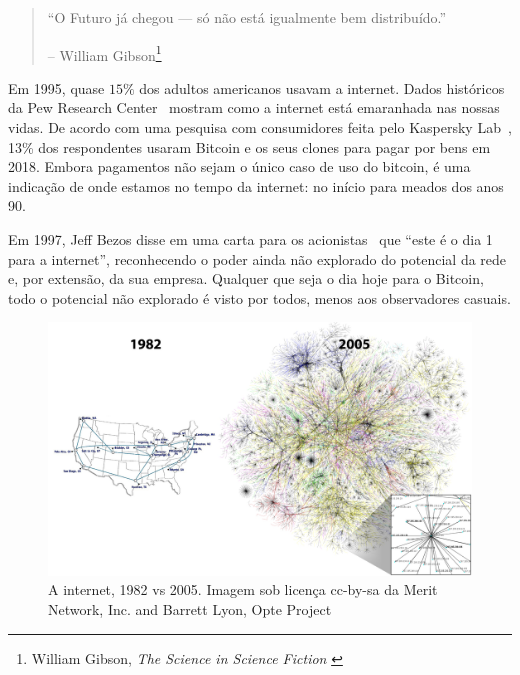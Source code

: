 \begin{quotation}\begin{samepage}
\enquote{O Futuro já chegou --- só não está igualmente bem distribuído.}
\begin{flushright} -- William Gibson\footnote{William Gibson, \textit{The Science in Science Fiction} \cite{william-gibson}}
\end{flushright}\end{samepage}\end{quotation}

Em 1995, quase $15\%$ dos adultos americanos usavam a internet. Dados históricos da Pew Research Center~\cite{pew-research} mostram como a internet está emaranhada nas nossas vidas. De acordo com uma pesquisa com consumidores feita pelo Kaspersky Lab~\cite{web:kaspersky}, 13\% dos respondentes usaram Bitcoin e os seus clones para pagar por bens em 2018. Embora pagamentos não sejam o único caso de uso do bitcoin, é uma indicação de onde estamos no tempo da internet: no início para
meados dos anos 90.

Em 1997, Jeff Bezos disse em uma carta para os acionistas~\cite{bezos-letter} que \enquote{este é o dia 1 para a internet}, reconhecendo o poder ainda não explorado do potencial da rede e, por extensão, da sua empresa. Qualquer que seja o dia hoje para o Bitcoin, todo o potencial não explorado é visto por todos, menos aos observadores casuais. 

\begin{figure}
  \includegraphics{assets/images/internet-evolution-white-dates.png}
  \caption{A internet, 1982 vs 2005. Imagem sob licença cc-by-sa da Merit Network, Inc. and Barrett Lyon, Opte Project}
  \label{fig:internet-evolution-white-dates}
\end{figure}

